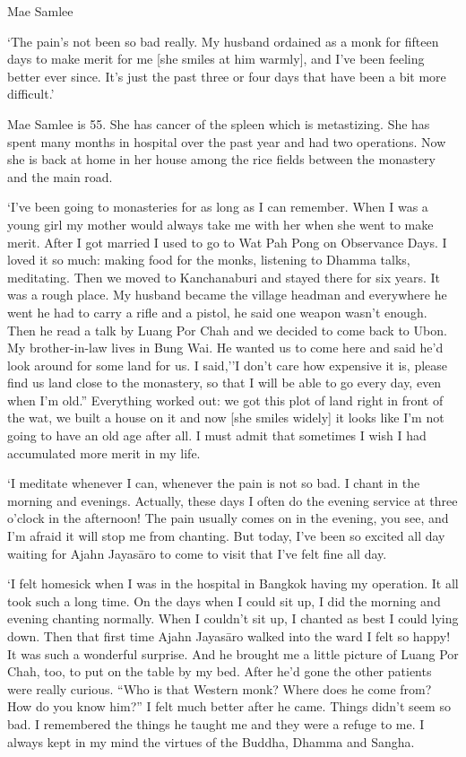 Mae Samlee

`The pain's not been so bad really. My husband ordained as a monk for
fifteen days to make merit for me {[}she smiles at him warmly{]}, and
I've been feeling better ever since. It's just the past three or four
days that have been a bit more difficult.'

Mae Samlee is 55. She has cancer of the spleen which is metastizing. She
has spent many months in hospital over the past year and had two
operations. Now she is back at home in her house among the rice fields
between the monastery and the main road.

`I've been going to monasteries for as long as I can remember. When I
was a young girl my mother would always take me with her when she went
to make merit. After I got married I used to go to Wat Pah Pong on
Observance Days. I loved it so much: making food for the monks,
listening to Dhamma talks, meditating. Then we moved to Kanchanaburi and
stayed there for six years. It was a rough place. My husband became the
village headman and everywhere he went he had to carry a rifle and a
pistol, he said one weapon wasn't enough. Then he read a talk by Luang
Por Chah and we decided to come back to Ubon. My brother-in-law lives in
Bung Wai. He wanted us to come here and said he'd look around for some
land for us. I said,''I don't care how expensive it is, please find us
land close to the monastery, so that I will be able to go every day,
even when I'm old.'' Everything worked out: we got this plot of land
right in front of the wat, we built a house on it and now {[}she smiles
widely{]} it looks like I'm not going to have an old age after all. I
must admit that sometimes I wish I had accumulated more merit in my
life.

`I meditate whenever I can, whenever the pain is not so bad. I chant in
the morning and evenings. Actually, these days I often do the evening
service at three o'clock in the afternoon! The pain usually comes on in
the evening, you see, and I'm afraid it will stop me from chanting. But
today, I've been so excited all day waiting for Ajahn Jayasāro to come
to visit that I've felt fine all day.

`I felt homesick when I was in the hospital in Bangkok having my
operation. It all took such a long time. On the days when I could sit
up, I did the morning and evening chanting normally. When I couldn't sit
up, I chanted as best I could lying down. Then that first time Ajahn
Jayasāro walked into the ward I felt so happy! It was such a wonderful
surprise. And he brought me a little picture of Luang Por Chah, too, to
put on the table by my bed. After he'd gone the other patients were
really curious. ``Who is that Western monk? Where does he come from? How
do you know him?'' I felt much better after he came. Things didn't seem
so bad. I remembered the things he taught me and they were a refuge to
me. I always kept in my mind the virtues of the Buddha, Dhamma and
Sangha.

